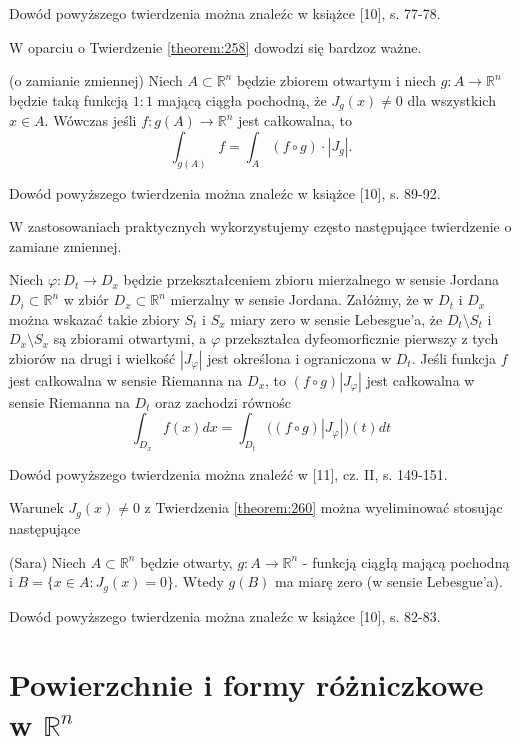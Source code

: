 \documentclass[leqno]{article}
\begin{document}
\begin{justify}
Dowód powyższego twierdzenia można znaleźc w książce [10], s. 77-78.

W oparciu o Twierdzenie \ref{theorem:258} dowodzi się bardzoz ważne.

\begin{theorem}
{
    (o zamianie zmiennej) Niech $A \subset \mathbb{R}^n$ będzie zbiorem otwartym i niech $g : A \to \mathbb{R}^n$ będzie taką funkcją $1 : 1$ mającą ciągła pochodną, że $J_g(x) \neq 0$ dla 
    wszystkich $x \in A$. Wówczas jeśli $f : g(A) \to \mathbb{R}^n$ jest całkowalna, to 
    \[
        \int_{g(A)}f = \int_A (f \circ g) \cdot |J_g|.
    \]
}
\end{theorem}

Dowód powyższego twierdzenia można znaleźc w książce [10], s. 89-92.

W zastosowaniach praktycznych wykorzystujemy często następujące twierdzenie o zamiane zmiennej.

\begin{theorem}
{
    Niech $\varphi : D_t \to D_x$ będzie przekształceniem zbioru mierzalnego w sensie Jordana $D_i \subset \mathbb{R}^n$ w zbiór $D_x \subset \mathbb{R}^n$ mierzalny w sensie Jordana.
    Załóżmy, że w $D_t$ i $D_x$ można wskazać takie zbiory $S_t$ i $S_x$ miary zero w sensie Lebesgue'a, że $D_t \setminus S_t$ i $D_x \setminus S_x$ są zbiorami otwartymi,
    a $\varphi$ przekształca dyfeomorficznie pierwszy z tych zbiorów na drugi i wielkość $|J_\varphi|$ jest określona i ograniczona w $D_t$.
    Jeśli funkcja $f$ jest całkowalna w sensie Riemanna na $D_x$, to $(f \circ g)|J_\varphi|$ jest całkowalna w sensie Riemanna na $D_t$ oraz zachodzi równośc 
    \[
        \int_{D_x}f(x)dx = \int_{D_t}\Big((f \circ g)|J_\varphi|\Big)(t)dt
    \]
}
\end{theorem}

Dowód powyższego twierdzenia można znaleźć w [11], cz. II, s. 149-151.

Warunek $J_g(x) \neq 0$ z Twierdzenia \ref{theorem:260} można wyeliminować stosując następujące

\begin{theorem}
{
    (Sara) Niech $A \subset \mathbb{R}^n$ będzie otwarty, $g : A \to \mathbb{R}^n$ - funkcją ciągłą mającą pochodną i $B = \{x \in A : J_g(x) = 0\}$.
    Wtedy $g(B)$ ma miarę zero (w sensie Lebesgue'a).
}
\end{theorem}

Dowód powyższego twierdzenia można znaleźc w książce [10], s. 82-83.

\section{Powierzchnie i formy różniczkowe w $\mathbb{R}^n$}


\end{justify}
\end{document}

